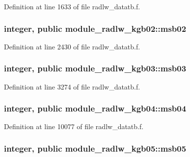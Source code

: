 Definition at line 1633 of file radlw\+\_\+datatb.\+f.

\subsubsection[{\texorpdfstring{msb02}{msb02}}]{\setlength{\rightskip}{0pt plus 5cm}integer, public module\+\_\+radlw\+\_\+kgb02\+::msb02}\hypertarget{group__module__radlw__main_ga03e70b84fd16795104a3fb7b425af70c}{}\label{group__module__radlw__main_ga03e70b84fd16795104a3fb7b425af70c}


Definition at line 2430 of file radlw\+\_\+datatb.\+f.

\subsubsection[{\texorpdfstring{msb03}{msb03}}]{\setlength{\rightskip}{0pt plus 5cm}integer, public module\+\_\+radlw\+\_\+kgb03\+::msb03}\hypertarget{group__module__radlw__main_gac57ba9584cbc3a5e4e2e0a6b548d21e9}{}\label{group__module__radlw__main_gac57ba9584cbc3a5e4e2e0a6b548d21e9}


Definition at line 3274 of file radlw\+\_\+datatb.\+f.

\subsubsection[{\texorpdfstring{msb04}{msb04}}]{\setlength{\rightskip}{0pt plus 5cm}integer, public module\+\_\+radlw\+\_\+kgb04\+::msb04}\hypertarget{group__module__radlw__main_gab9ce0111a156f7b80f2adaa9f3e84a32}{}\label{group__module__radlw__main_gab9ce0111a156f7b80f2adaa9f3e84a32}


Definition at line 10077 of file radlw\+\_\+datatb.\+f.

\subsubsection[{\texorpdfstring{msb05}{msb05}}]{\setlength{\rightskip}{0pt plus 5cm}integer, public module\+\_\+radlw\+\_\+kgb05\+::msb05}\hypertarget{group__module__radlw__main_ga0f3b6573bfe94c5a5968cda2dc8b1adf}{}\label{group__module__radlw__main_ga0f3b6573bfe94c5a5968cda2dc8b1adf}


